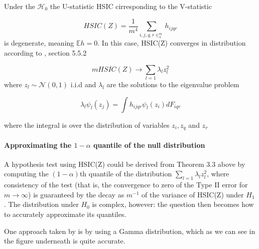 \begin{thm}
Under the $\mathcal{H}_{0}$ the U-statistic HSIC cirresponding to the V-statistic 
\vspace{5mm}

$$ HSIC(Z) = \frac{1}{m^{4}}\sum_{i,j,q,r \in_{4}^{m}} h_{ijqr}$$ 
is degenerate, meaning $\mathbb{E}h=0$. In this case, HSIC(Z) converges in distribution according to \cite{HSICDegenerate}, section 5.5.2
\vspace{5mm}

$$mHSIC(Z)\rightarrow \sum_{l=1} \lambda_{l}z_{l}^{2}$$
where $z_{l}\sim \mathcal{N}(0,1)$ i.i.d and $\lambda_{l}$ are the solutions to the eigenvalue problem

$$
\lambda_{l}\psi_{l}(z_{j}) = \int h_{ijqr}\psi_{l}(z_{i})dF_{iqr}
$$

where the integral is over the distribution of variables $z_{i},z_{q}$ and $z_{r}$\cite{HSICdistribution}
\end{thm}


\paragraph{Approximating the $1-\alpha$ quantile of the null distribution}

A hypothesis test using HSIC(Z)
could be derived from Theorem 3.3 above by computing the $(1 − \alpha)$th quantile of the distribution  $\sum_{l=1} \lambda_{l}z_{l}^{2}$,
where consistency of the test (that is, the convergence to zero of the Type II error for $m \rightarrow \infty$) is
guaranteed by the decay as $m^{-1}$ of the variance of HSIC(Z) under $H_{1}$ . The distribution under $H_{0}$
is complex, however: the question then becomes how to accurately approximate its quantiles.

One approach taken by \cite{HSICdistribution} is by using a Gamma distribution, which as we can see in the figure underneath is quite accurate.

